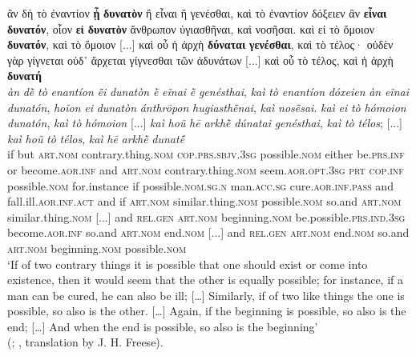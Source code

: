 \documentclass[output=paper,colorlinks,citecolor=brown]{langscibook}
\begin{document}
\ea\label{Ex5}
    \glll ἂν δὴ τὸ ἐναντίον \textbf{ᾖ} \textbf{δυνατὸν} ἢ εἶναι ἢ γενέσθαι, καὶ τὸ ἐναντίον δόξειεν ἂν \textbf{εἶναι} \textbf{δυνατόν}, οἷον \textbf{εἰ} \textbf{δυνατὸν} ἄνθρωπον ὑγιασθῆναι, καὶ νοσῆσαι. καὶ εἰ τὸ ὅμοιον \textbf{δυνατόν}, καὶ τὸ ὅμοιον [...] καὶ οὗ ἡ ἀρχὴ \textbf{δύναται} \textbf{γενέσθαι}, καὶ τὸ τέλος· οὐδὲν γὰρ γίγνεται οὐδ᾽ ἄρχεται γίγνεσθαι τῶν ἀδυνάτων [...] καὶ οὗ τὸ τέλος, καὶ ἡ ἀρχὴ \textbf{δυνατή} \\
    \textit{àn} \textit{dḕ} \textit{tò} \textit{enantíon} \textit{ē̃i} \textit{dunatòn} \textit{ḕ} \textit{eĩnai} \textit{ḕ} \textit{genésthai}, \textit{kaì} \textit{tò} \textit{enantíon} \textit{dóxeien} \textit{àn} \textit{eĩnai} \textit{dunatón}, \textit{hoĩon} \textit{ei} \textit{dunatòn} \textit{ánthrōpon} \textit{hugiasthē̃nai}, \textit{kaì} \textit{nosē̃sai}. \textit{kaì} \textit{ei} \textit{tò} \textit{hómoion} \textit{dunatón}, \textit{kaì} \textit{tò} \textit{hómoion} [...] \textit{kaì} \textit{hoũ} \textit{hē} \textit{arkhḕ} \textit{dúnatai} \textit{genésthai}, \textit{kaì} \textit{tò} \textit{télos}; [...] \textit{kaì} \textit{hoũ} \textit{tò} \textit{télos}, \textit{kaì} \textit{hē} \textit{arkhḕ} \textit{dunatḗ}\\
	if but \textsc{art}.\textsc{nom} contrary.thing.\textsc{nom} \textsc{cop}.\textsc{prs.sbjv.3sg} possible.\textsc{nom} either be.\textsc{prs.inf} or become.\textsc{aor.inf} and \textsc{art}.\textsc{nom} contrary.thing.\textsc{nom} seem.\textsc{aor.opt.3sg} \textsc{prt} \textsc{cop}.\textsc{inf} possible.\textsc{nom} for.instance if possible.\textsc{nom.sg.n} man.\textsc{acc.sg} cure.\textsc{aor.inf.pass} and fall.ill.\textsc{aor.inf.act} and if \textsc{art}.\textsc{nom} similar.thing.\textsc{nom} possible.\textsc{nom} so.and \textsc{art}.\textsc{nom} similar.thing.\textsc{nom} [...] and \textsc{rel}.\textsc{gen} \textsc{art}.\textsc{nom} beginning.\textsc{nom} be.possible.\textsc{prs.ind.3sg} become.\textsc{aor.inf} so.and \textsc{art}.\textsc{nom} end.\textsc{nom} [...] and \textsc{rel}.\textsc{gen} \textsc{art}.\textsc{nom} end.\textsc{nom} so.and \textsc{art}.\textsc{nom} beginning.\textsc{nom} possible.\textsc{nom}\\
	\glt ‘If of two contrary things it is possible that one should exist or come into existence, then it would seem that the other is equally possible; for instance, if a man can be cured, he can also be ill; […] Similarly, if of two like things the one is possible, so also is the other. […] Again, if the beginning is possible, so also is the end; […] And when the end is possible, so also is the beginning' \\
 \hspace*{\fill}(; , translation by J. H. Freese).
\z
\end{document}
